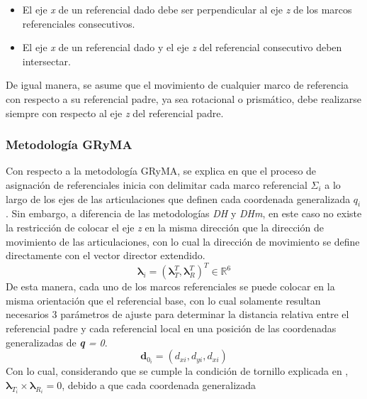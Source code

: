         \begin{itemize}
            \item El eje \emph{x} de un referencial dado debe ser perpendicular al eje \emph{z} de los marcos referenciales consecutivos.
            \item El eje \emph{x} de un referencial dado y el eje \emph{z} del referencial consecutivo deben intersectar.
        \end{itemize}

        De igual manera, se asume que el movimiento de cualquier marco de referencia con respecto 
        a su referencial padre, ya sea rotacional o prismático, debe realizarse siempre con respecto 
        al eje \emph{z} del referencial padre.

    \subsubsection{Metodología GRyMA}
        \noindent Con respecto a la metodología GRyMA, se explica en \cite{3DMotion} que el proceso de asignación 
        de referenciales inicia con delimitar cada marco referencial $\Sigma_i$ a lo largo de los ejes 
        de las articulaciones que definen cada coordenada generalizada $q_i$. Sin embargo, a 
        diferencia de las metodologías \emph{DH} y \emph{DHm}, en este caso no existe la 
        restricción de colocar el eje \emph{z} en la misma dirección que la dirección de movimiento de las 
        articulaciones, con lo cual la dirección de movimiento se define directamente con el 
        vector director extendido.
        \begin{equation*}
            \boldsymbol{\lambda}_i = (\boldsymbol{\lambda}^T_T, \boldsymbol{\lambda}^T_R)^T \in \mathbb{R}^6
        \end{equation*}
        De esta manera, cada uno de los marcos referenciales se puede colocar en la misma 
        orientación que el referencial base, con lo cual solamente resultan necesarios 3 
        parámetros de ajuste para determinar la distancia relativa entre el referencial 
        padre y cada referencial local en una posición de las coordenadas generalizadas de 
        \emph{\textbf{q} = 0}.
        \begin{equation*}
            \boldsymbol{d}_{0_i} = (d_{xi}, d_{yi}, d_{xi})
        \end{equation*}
        Con lo cual, considerando que se cumple la condición de tornillo explicada en \cite{3DMotion}, 
        $\boldsymbol{\lambda}_{T_i} \times \boldsymbol{\lambda}_{R_i} = 0$, debido a que cada coordenada generalizada 
